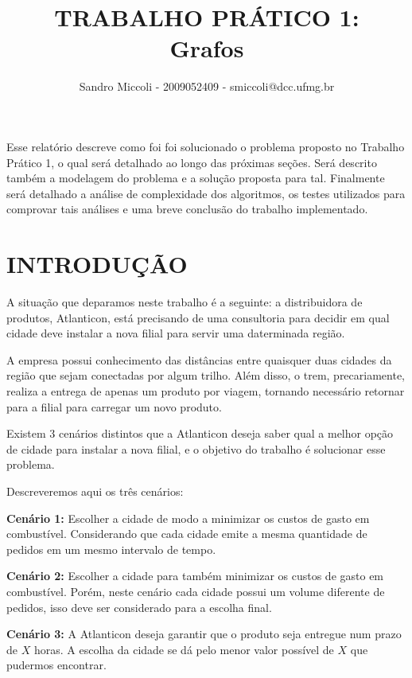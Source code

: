 \documentclass[12pt]{article}
\title{TRABALHO PRÁTICO 1: \\ Grafos}
\author{Sandro Miccoli - 2009052409 - smiccoli@dcc.ufmg.br}
\begin{document}
\maketitle

\begin{resumo}
Esse relatório descreve como foi foi solucionado o problema proposto no Trabalho Prático 1, o qual será detalhado ao longo das próximas seções. Será descrito também a modelagem do problema e a solução proposta para tal. Finalmente será detalhado a análise de complexidade dos algoritmos, os testes utilizados para comprovar tais análises e uma breve conclusão do trabalho implementado.

\end{resumo}

\section{INTRODUÇÃO}

	A situação que deparamos neste trabalho é a seguinte: a distribuidora de produtos, Atlanticon, está precisando de uma consultoria para decidir em qual cidade deve instalar a nova filial para servir uma daterminada região.

	A empresa possui conhecimento das distâncias entre quaisquer duas cidades da região que sejam conectadas por algum trilho. Além disso, o trem, precariamente, realiza a entrega de apenas um produto por viagem, tornando necessário retornar para a filial para carregar um novo produto.

	Existem 3 cenários distintos que a Atlanticon deseja saber qual a melhor opção de cidade para instalar a nova filial, e o objetivo do trabalho é solucionar esse problema.

	Descreveremos aqui os três cenários:

	\textbf{Cenário 1: } Escolher a cidade de modo a minimizar os custos de gasto em combustível. Considerando que cada cidade emite a mesma quantidade de pedidos em um mesmo intervalo de tempo.

	\textbf{Cenário 2: } Escolher a cidade para também minimizar os custos de gasto em combustível. Porém, neste cenário cada cidade possui um volume diferente de pedidos, isso deve ser considerado para a escolha final.

	\textbf{Cenário 3: } A Atlanticon deseja garantir que o produto seja entregue num prazo de $X$ horas. A escolha da cidade se dá pelo menor valor possível de $X$ que pudermos encontrar.
\end{document}

